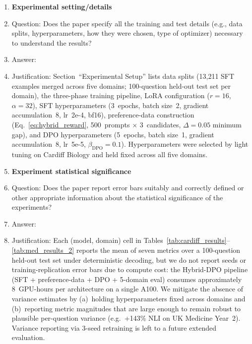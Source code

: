\begin{enumerate}
\item {\bf Experimental setting/details}
    \item[] Question: Does the paper specify all the training and test details (e.g., data splits, hyperparameters, how they were chosen, type of optimizer) necessary to understand the results?
    \item[] Answer: \answerYes{}
    \item[] Justification: Section~``Experimental Setup'' lists data splits (13{,}211 SFT examples merged across five domains; 100-question held-out test set per domain), the three-phase training pipeline, LoRA configuration ($r{=}16$, $\alpha{=}32$), SFT hyperparameters (3~epochs, batch size~2, gradient accumulation~8, lr~2e-4, bf16), preference-data construction (Eq.~\ref{eq:hybrid_reward}, 500~prompts $\times$ 3~candidates, $\Delta{=}0.05$ minimum gap), and DPO hyperparameters (5~epochs, batch size~1, gradient accumulation~8, lr~5e-5, $\beta_{\text{DPO}}{=}0.1$). Hyperparameters were selected by light tuning on Cardiff Biology and held fixed across all five domains.

\item {\bf Experiment statistical significance}
    \item[] Question: Does the paper report error bars suitably and correctly defined or other appropriate information about the statistical significance of the experiments?
    \item[] Answer: \answerNo{}
    \item[] Justification: Each (model, domain) cell in Tables~\ref{tab:cardiff_results}--\ref{tab:med_results_2} reports the mean of seven metrics over a 100-question held-out test set under deterministic decoding, but we do not report seeds or training-replication error bars due to compute cost: the Hybrid-DPO pipeline (SFT + preference-data + DPO + 5-domain eval) consumes approximately 8~GPU-hours per architecture on a single A100. We mitigate the absence of variance estimates by (a)~holding hyperparameters fixed across domains and (b)~reporting metric magnitudes that are large enough to remain robust to plausible per-question variance (e.g.\ +143\% NLI on UK Medicine Year~2). Variance reporting via 3-seed retraining is left to a future extended evaluation.


\end{enumerate}
